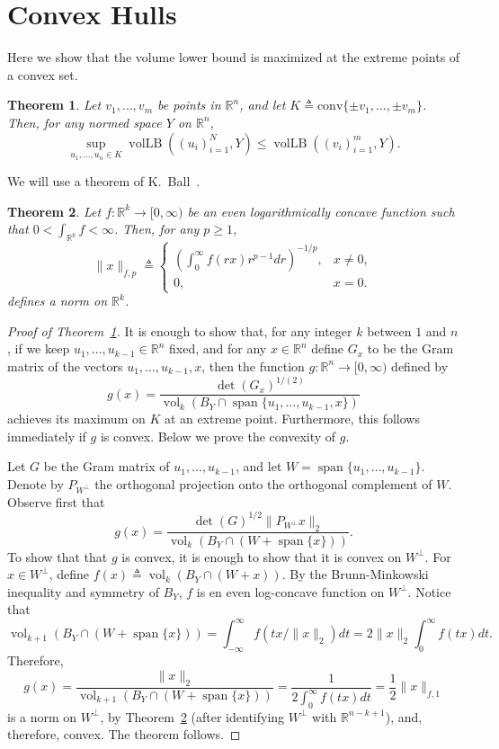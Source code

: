 \documentclass{article}
\newtheorem{theorem}{Theorem}
\newcommand{\R}{{\mathbb{R}}}
\newcommand{\eqdef}{\triangleq}
\DeclareMathOperator{\vollb}{volLB}
\DeclareMathOperator{\vol}{vol}
\DeclareMathOperator{\lspan}{span}
\begin{document}
\section{Convex Hulls}

Here we show that the volume lower bound is maximized at the extreme
points of a convex set.

\begin{theorem}\label{thm:conv-hull}
  Let $v_1, \ldots, v_m$ be points in $\R^n$, and let $K \eqdef
  \mathrm{conv}\{\pm v_1, \ldots, \pm v_m\}$. Then, for any normed
  space $Y$ on $\R^n$, 
  \[
  \sup_{u_1, \ldots, u_n \in K}\vollb((u_i)_{i = 1}^N, Y)
  \le
  \vollb((v_i)_{i = 1}^m, Y).
  \]
\end{theorem}

We will use a theorem of K.~Ball~\cite{Ball88}.

\begin{theorem}\label{thm:ball-logconcave}
  Let $f: \R^k \to [0, \infty)$ be an even logarithmically concave
  function such that $0 < \int_{\R^k} f < \infty$. Then, for any $p
  \ge 1$, 
  \[
  \|x\|_{f,p} \eqdef 
  \begin{cases}
    \left(\int_0^\infty f(rx) r^{p-1}dr\right)^{-1/p}, &x \neq 0,\\
    0, &x = 0.
  \end{cases}
  \]
  defines a norm on $\R^k$. 
\end{theorem}


\begin{proof}[Proof of Theorem~\ref{thm:conv-hull}]
  It is enough to show that, for any integer $k$ between $1$ and $n$,
  if we keep $u_1, \ldots, u_{k-1} \in \R^n$ fixed, and for any $x\in
  \R^n$ define $G_x$ to be the Gram matrix of the vectors $u_1,
  \ldots, u_{k-1}, x$, then the function $g: \R^n \to [0, \infty)$
  defined by
  \[
  g(x) = \frac{\det(G_x)^{1/(2)}}{\vol_k(B_Y \cap \lspan\{u_1,
    \ldots, u_{k-1}, x\})}
  \]
  achieves its maximum on $K$ at an extreme point. Furthermore, this
  follows immediately if $g$ is convex. Below we prove the convexity
  of $g$.

  Let $G$ be the Gram matrix of $u_1, \ldots, u_{k-1}$, and let $W =
  \lspan\{u_1, \ldots, u_{k-1}\}$. Denote by $P_{W^\perp}$ the
  orthogonal projection onto the orthogonal complement of $W$.
  Observe first that
  \[
  g(x) = \frac{\det(G)^{1/2}\|P_{W^\perp}x\|_2}{\vol_k(B_Y \cap (W +
    \lspan\{x\}))}. 
  \]
  To show that that $g$ is convex, it is enough to show that it is
  convex on $W^\perp$.  For $x \in W^\perp$, define $f(x) \eqdef
  \vol_{k}(B_Y \cap (W + x))$. By the Brunn-Minkowski inequality and
  symmetry of $B_Y$, $f$ is en even log-concave function on
  $W^\perp$. Notice that
  \[
  \vol_{k+1}(B_Y \cap  (W + \lspan\{x\}))
  = 
  \int_{-\infty}^\infty{f(tx/\|x\|_2)dt} 
  = 
  2\|x\|_2 \int_{0}^\infty{f(tx)dt}.
  \]
  Therefore, 
  \[
  g(x) = 
  \frac{\|x\|_2}{\vol_{k+1}(B_Y \cap  (W + \lspan\{x\}))}
  = 
  \frac{1}{2\int_{0}^\infty{f(tx)dt}}
  = \frac{1}{2}\|x\|_{f,1}
  \]
  is a norm on $W^\perp$, by Theorem~\ref{thm:ball-logconcave} (after
  identifying $W^\perp$ with $\R^{n-k+1}$), and, therefore, convex. The
  theorem follows.
\end{proof}
\end{document}
